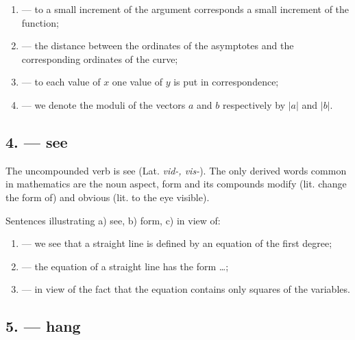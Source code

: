 \begin{enumerate}[label=\alph*)]
\item {} --- to a small increment of the argument corresponds a small increment of the function;
\item {} --- the distance between the ordinates of the asymptotes and the corresponding ordinates of the curve;
\item {} --- to each value of $x$ one value of $y$ is put in correspondence;
\item {} --- we denote the moduli of the vectors $a$ and $b$ respectively by $|a|$ and $|b|$.
\end{enumerate}

\subsection*{4.  --- see}

The uncompounded verb is  see (Lat. \emph{vid-, vis-}). The only derived words common in mathematics are the noun  aspect, form and its compounds  modify (lit. change the form of) and  obvious (lit. to the eye visible).

Sentences illustrating a)  see, b)  form, c)  in view of:

\begin{enumerate}[label=\alph*)]
\item {} --- we see that a straight line is defined by an equation of the first degree;
\item {} --- the equation of a straight line has the form \ldots;
\item {} --- in view of the fact that the equation contains only squares of the variables.
\end{enumerate}

\subsection*{5.  --- hang}

